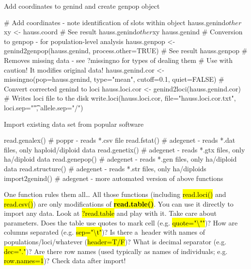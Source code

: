 \documentclass[compress, ucs, xelatex, 11pt, xcolor=svgnames,
  hyperref={
    bookmarks=true,
    unicode=true,
    colorlinks=true,
    pdftitle={Molecular data in R},
    plainpages=false,
    pdfauthor={Vojtech Zeisek},
    pdfsubject={Course about phylogeny and evolution in R},
    pdfcreator={XeLaTeX},
    pdfkeywords={R, evolution, phylogeny, molecular data},
    linkcolor=Tomato,
    anchorcolor=SaddleBrown,
    citecolor=Goldenrod,
    filecolor=DarkMagenta,
    menucolor=Sienna,
    urlcolor=DarkTurquoise,
    pdftex},
  url={hyphens, lowtilde} %
  ]{beamer}
\renewcommand{\texttt}[1]{\hl{\ttfamily #1}}
\begin{document}
\begin{frame}[fragile]{Add coordinates to genind and create genpop object}
  \begin{spluscode}
    # Add coordinates - note identification of slots within object
    hauss.genind$other$xy <- hauss.coord
    # See result
    hauss.genind$other$xy
    hauss.genind
    # Conversion to genpop - for population-level analysis
    hauss.genpop <- genind2genpop(hauss.genind, process.other=TRUE)
    # See result
    hauss.genpop
    # Removes missing data - see ?missingno for types of dealing them
    # Use with caution! It modifies original data!
    hauss.genind.cor <- missingno(pop=hauss.genind, type="mean", cutoff=0.1,
      quiet=FALSE)
    # Convert corrected genind to loci
    hauss.loci.cor <- genind2loci(hauss.genind.cor)
    # Writes loci file to the disk
    write.loci(hauss.loci.cor, file="hauss.loci.cor.txt",
      loci.sep="\t", allele.sep="/")
  \end{spluscode}
\end{frame}

\begin{frame}[fragile]{Import existing data set from popular software}
  \begin{spluscode}
    read.genalex() # poppr - reads *.csv file
    read.fstat() # adegenet - reads *.dat files, only haploid/diploid data
    read.genetix() # adegenet - reads *.gtx files, only ha/diploid data
    read.genepop() # adegenet - reads *.gen files, only ha/diploid data
    read.structure() # adegenet - reads *.str files, only ha/diploids
    import2genind() # adegenet - more automated version of above functions
  \end{spluscode}
  \begin{block}{One function rules them all\ldots}
    All those functions (including \texttt{read.loci()} and \texttt{read.csv()}) are only modifications of \textbf{\texttt{read.table()}}. You can use it directly to import any data. Look at \texttt{?read.table} and play with it. Take care about parameters. Does the table use quotes to mark cell (e.g. \texttt{quote="\textbackslash ""})? How are columns separated (e.g. \texttt{sep="\textbackslash t"})? Is there a~header with names of populations/loci/whatever (\texttt{header=T/F})? What is decimal separator (e.g. \texttt{dec="."})? Are there row names (used typically as names of individuals; e.g. \texttt{row.names=1})? \alert{Check data after import!}
  \end{block}
\end{frame}
\end{document}
